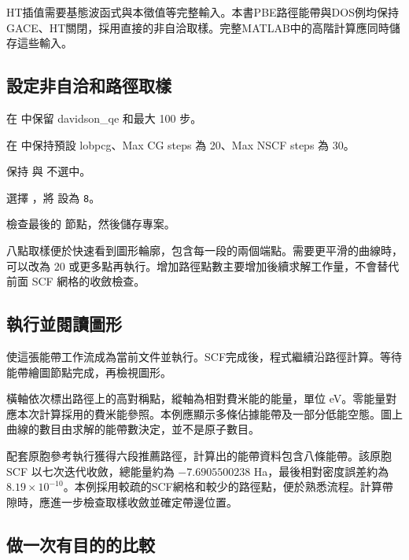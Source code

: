 HT插值需要基態波函式與本徵值等完整輸入。本書PBE路徑能帶與DOS例均保持GACE、HT關閉，採用直接的非自洽取樣。完整MATLAB\regmark{}中的高階計算應同時儲存這些輸入。


\subsection{設定非自洽和路徑取樣}

\begin{steps}
\item 在  中保留 davidson\_qe 和最大 100 步。
\item 在  中保持預設 lobpcg、Max CG steps 為 20、Max NSCF steps 為 30。
\item 保持  與  不選中。
\item 選擇 ，將 \mbox{} 設為 \texttt{8}。
\item 檢查最後的  節點，然後儲存專案。
\end{steps}

八點取樣便於快速看到圖形輪廓，包含每一段的兩個端點。需要更平滑的曲線時，可以改為 $20$ 或更多點再執行。增加路徑點數主要增加後續求解工作量，不會替代前面 SCF 網格的收斂檢查。

\subsection{執行並閱讀圖形}

使這張能帶工作流成為當前文件並執行。SCF完成後，程式繼續沿路徑計算。等待能帶繪圖節點完成，再檢視圖形。

橫軸依次標出路徑上的高對稱點，縱軸為相對費米能的能量，單位 eV。零能量對應本次計算採用的費米能參照。本例應顯示多條佔據能帶及一部分低能空態。圖上曲線的數目由求解的能帶數決定，並不是原子數目。


配套原胞參考執行獲得六段推薦路徑，計算出的能帶資料包含八條能帶。該原胞 SCF 以七次迭代收斂，總能量約為 $-7.6905500238$ Ha，最後相對密度誤差約為 $8.19\times10^{-10}$。本例採用較疏的SCF網格和較少的路徑點，便於熟悉流程。計算帶隙時，應進一步檢查取樣收斂並確定帶邊位置。

\subsection{做一次有目的的比較}

